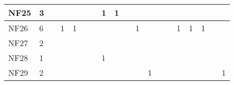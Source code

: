 \begin{table}[]
{\begin{tabular}{|l|l|l|l|l|l|l|l|l|l|l|l|l|l|l|l|l|l|l|}
NF25 & 3                                                     &                                                  &    &    &    &    & 1                                                & 1  &    &    &    &                                                   &    &                                                   &    &                                                             &                                                             &                                                             \\ \hline
NF26 & 6                                                     &                                                  & 1  & 1  &    &    &                                                  &    &    & 1  &    &                                                   &    & 1                                                 & 1  & 1                                                           &                                                             &                                                             \\ \hline
NF27 & 2                                                     &                                                  &    &    &    &    &                                                  &    &    &    &    &                                                   &    &                                                   &    &                                                             &                                                             &                                                             \\ \hline
NF28 & 1                                                     &                                                  &    &    &    &    & 1                                                &    &    &    &    &                                                   &    &                                                   &    &                                                             &                                                             &                                                             \\ \hline
NF29 & 2                                                     &                                                  &    &    &    &    &                                                  &    &    &    & 1  &                                                   &    &                                                   &    &                                                             &                                                             & 1                                                           \\ \hline

\end{tabular}}
\end{table}
